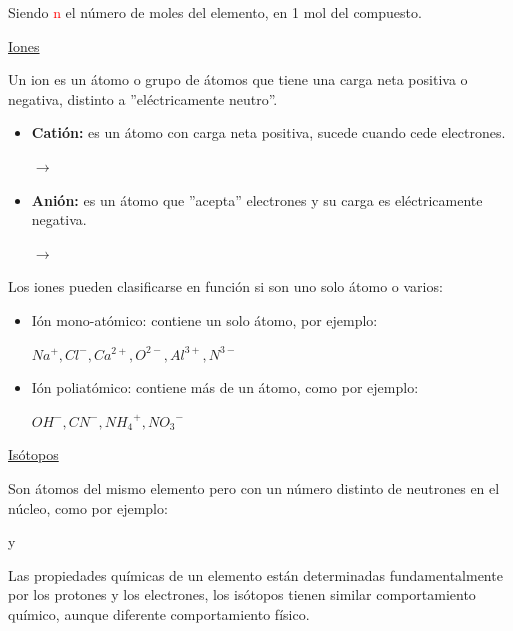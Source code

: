                 \indent Siendo \textcolor{red}{n} el número de moles del elemento, en 1 mol del compuesto.
            \begin{center} \underline{Iones} \end{center}
            \indent Un ion es un átomo o grupo de átomos que tiene una carga neta positiva o negativa, distinto a ''eléctricamente neutro''. \\[5pt]
                \saltoPag%
                \begin{itemize}
                    \item \textbf{Catión:} es un átomo con carga neta positiva, sucede cuando cede electrones.
                        \begin{center}  $\rightarrow$  \end{center}
                    \item \textbf{Anión:} es un átomo que ''acepta'' electrones y su carga es eléctricamente negativa.
                        \begin{center}  $\rightarrow$  \end{center}
                \end{itemize}
                \indent Los iones pueden clasificarse en función si son uno solo átomo o varios:
                \begin{itemize} 
                    \item Ión mono-atómico: contiene un solo átomo, por ejemplo:
                        \begin{center} ${Na^+},{Cl^-},{Ca^{2+}},{O^{2-}},{Al^{3+}},{N^{3-}}$ \end{center}
                    \item Ión poliatómico: contiene más de un átomo, como por ejemplo:
                        \begin{center} ${OH^-},{CN^-},{{NH_4}^{+}},{{NO_3}^{-}}$ \end{center}
                \end{itemize}

            \begin{center} \underline{Isótopos} \end{center}
                \indent Son átomos del mismo elemento pero con un número distinto de neutrones en el núcleo, como por ejemplo:
                \begin{center}  y  \end{center}
                \indent Las propiedades químicas de un elemento están determinadas fundamentalmente por los protones y los electrones, los isótopos tienen similar comportamiento químico, aunque diferente comportamiento físico.

